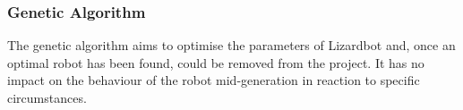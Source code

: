 \documentclass{article}
\begin{document}
\subsubsection{Genetic Algorithm}
The genetic algorithm aims to optimise the parameters of Lizardbot and, once an optimal robot has been found, could be removed from the project. It has no impact on the behaviour of the robot mid-generation in reaction to specific circumstances.\\
\end{document}
